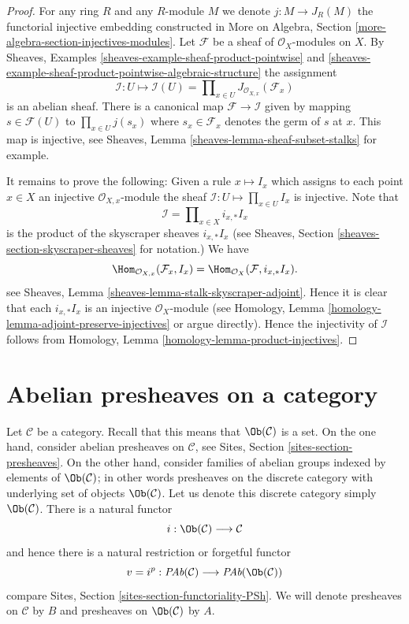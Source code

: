 \begin{proof}
For any ring $R$ and any $R$-module $M$ we denote
$j : M \to J_R(M)$ the functorial
injective embedding constructed in
More on Algebra, Section \ref{more-algebra-section-injectives-modules}.
Let $\mathcal{F}$ be a sheaf of $\mathcal{O}_X$-modules on $X$.
By Sheaves, Examples \ref{sheaves-example-sheaf-product-pointwise}
and \ref{sheaves-example-sheaf-product-pointwise-algebraic-structure}
the assignment
$$
\mathcal{I} : U \mapsto
\mathcal{I}(U) = \prod\nolimits_{x\in U} J_{\mathcal{O}_{X, x}}(\mathcal{F}_x)
$$
is an abelian sheaf.
There is a canonical map $\mathcal{F} \to \mathcal{I}$
given by mapping $s \in \mathcal{F}(U)$ to $\prod_{x \in U} j(s_x)$
where $s_x \in \mathcal{F}_x$ denotes the germ of $s$ at $x$.
This map is injective, see
Sheaves, Lemma \ref{sheaves-lemma-sheaf-subset-stalks}
for example.

\medskip\noindent
It remains to prove the following: Given a rule
$x \mapsto I_x$ which assigns to each point $x \in X$ an injective
$\mathcal{O}_{X, x}$-module
the sheaf $\mathcal{I} : U \mapsto \prod_{x \in U} I_x$
is injective. Note that
$$
\mathcal{I} = \prod\nolimits_{x \in X} i_{x, *}I_x
$$
is the product of the skyscraper sheaves $i_{x, *}I_x$ (see
Sheaves, Section \ref{sheaves-section-skyscraper-sheaves} for notation.)
We have
$$
\Hom_{\mathcal{O}_{X, x}}(\mathcal{F}_x, I_x)
=
\Hom_{\mathcal{O}_X}(\mathcal{F}, i_{x, *}I_x).
$$
see Sheaves, Lemma \ref{sheaves-lemma-stalk-skyscraper-adjoint}. Hence it is
clear that each $i_{x, *}I_x$ is an injective $\mathcal{O}_X$-module
(see Homology, Lemma \ref{homology-lemma-adjoint-preserve-injectives} or argue
directly). Hence the injectivity of $\mathcal{I}$ follows from
Homology, Lemma \ref{homology-lemma-product-injectives}.
\end{proof}

\section{Abelian presheaves on a category}
\label{injectives-section-injectives-presheaves}
Let $\mathcal{C}$ be a category. Recall that this means that
$\Ob(\mathcal{C})$ is a set. On the one hand, consider abelian
presheaves on $\mathcal{C}$, see
Sites, Section \ref{sites-section-presheaves}.
On the other hand, consider families of abelian groups
indexed by elements of $\Ob(\mathcal{C})$; in other
words presheaves on the discrete category with underlying set
of objects $\Ob(\mathcal{C})$. Let us denote this
discrete category simply $\Ob(\mathcal{C})$.
There is a natural functor
$$
i : \Ob(\mathcal{C}) \longrightarrow \mathcal{C}
$$
and hence there is a natural restriction or forgetful functor
$$
v = i^p :
\textit{PAb}(\mathcal{C})
\longrightarrow
\textit{PAb}(\Ob(\mathcal{C}))
$$
compare Sites, Section \ref{sites-section-functoriality-PSh}.
We will denote presheaves
on $\mathcal{C}$ by $B$ and presheaves on
$\Ob(\mathcal{C})$ by $A$.

